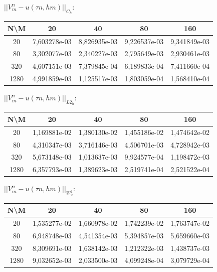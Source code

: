\documentclass[a4paper, 11pt]{article}
\begin{document}
$||V_m^n - u (\tau n, hm)||_{C_h}$:
\begin{center}
\begin{tabular}{|c|c|c|c|c|}
\hline 
 N\textbackslash M &      20      &      40      &      80      &     160      \\ 
 \hline 
        20         & 7,603278e-03 & 8,826935e-03 & 9,226537e-03 & 9,341849e-03 \\ 
 \hline 
        80         & 3,302077e-03 & 2,340227e-03 & 2,795649e-03 & 2,930461e-03 \\ 
 \hline 
        320        & 4,607151e-03 & 7,379845e-04 & 6,189833e-04 & 7,411660e-04 \\ 
 \hline 
       1280        & 4,991859e-03 & 1,125517e-03 & 1,803059e-04 & 1,568410e-04 \\ 
 \hline 
\end{tabular}
\end{center}
$||V_m^n - u (\tau n, hm)||_{L2_h}$:
\begin{center}
\begin{tabular}{|c|c|c|c|c|}
\hline 
 N\textbackslash M &      20      &      40      &      80      &     160      \\ 
 \hline 
        20         & 1,169881e-02 & 1,380130e-02 & 1,455186e-02 & 1,474642e-02 \\ 
 \hline 
        80         & 4,310347e-03 & 3,716146e-03 & 4,506701e-03 & 4,728942e-03 \\ 
 \hline 
        320        & 5,673148e-03 & 1,013637e-03 & 9,924577e-04 & 1,198472e-03 \\ 
 \hline 
       1280        & 6,357793e-03 & 1,389623e-03 & 2,519741e-04 & 2,521522e-04 \\ 
 \hline 
\end{tabular}
\end{center}
$||V_m^n - u (\tau n, hm)||_{W_2^1}$:
\begin{center}
\begin{tabular}{|c|c|c|c|c|}
\hline 
 N\textbackslash M &      20      &      40      &      80      &     160      \\ 
 \hline 
        20         & 1,535277e-02 & 1,660978e-02 & 1,742239e-02 & 1,763747e-02 \\ 
 \hline 
        80         & 6,948748e-03 & 4,541354e-03 & 5,394857e-03 & 5,659660e-03 \\ 
 \hline 
        320        & 8,309691e-03 & 1,638142e-03 & 1,212322e-03 & 1,438737e-03 \\ 
 \hline 
       1280        & 9,032652e-03 & 2,033500e-03 & 4,099248e-04 & 3,079729e-04 \\ 
 \hline 
\end{tabular}
\end{center}
\end{document}
